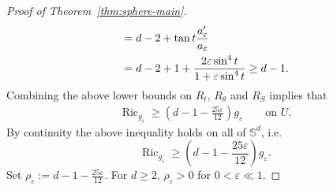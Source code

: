 \documentclass[11pt,reqno]{amsart}
\numberwithin{equation}{section}
\theoremstyle{definition}
\theoremstyle{remark}
\newcommand{\0}{\emptyset}
\newcommand{\veps}{\varepsilon}
\newcommand{\bbS}{\mathbb S}
\begin{document}
\begin{proof}[Proof of Theorem~\ref{thm:sphere-main}]
\begin{align}
    &=
    d-2+\tan t\frac{a_\veps'}{a_\veps} \notag\\
    &=
    d-2+1+\frac{2\veps\sin^4t}{1+\veps\sin^4t}
    \geq d-1.
\end{align}
Combining the above lower bounds on $R_t$, $R_\theta$ and $R_S$ implies that
\begin{align}
        \operatorname{Ric}_{g_\varepsilon}
        \geq
        \left(
        d-1-\frac{25 \varepsilon}{12}
        \right)g_\varepsilon
        \qquad\text{on }U.
\end{align}
By continuity the above inequality holds on all of $\bbS^d$, i.e.
\begin{equation}\label{eq:ricci-lower}
        \operatorname{Ric}_{g_\varepsilon}
        \geq
        \left(
        d-1-\frac{25 \varepsilon}{12}
        \right)g_\varepsilon.
\end{equation}
Set $\rho_\veps:=d-1-\frac{25 \varepsilon}{12}.$ For $d\geq 2$, $\rho_\veps>0$ for $0<\veps\ll 1$.  


\end{proof}
\end{document}
